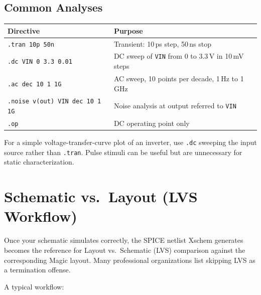 \documentclass[11pt]{article}
\begin{document}
\subsection{Common Analyses}

\begin{center}
\begin{tabular}{@{}lp{8.5cm}@{}}
\toprule
\textbf{Directive} & \textbf{Purpose} \\
\midrule
\texttt{.tran 10p 50n}        & Transient: 10\,ps step, 50\,ns stop \\
\texttt{.dc VIN 0 3.3 0.01}   & DC sweep of \texttt{VIN} from 0 to
                                3.3\,V in 10\,mV steps \\
\texttt{.ac dec 10 1 1G}      & AC sweep, 10 points per decade,
                                1\,Hz to 1\,GHz \\
\texttt{.noise v(out) VIN dec 10 1 1G}
                              & Noise analysis at output referred to
                                \texttt{VIN} \\
\texttt{.op}                  & DC operating point only \\
\bottomrule
\end{tabular}
\end{center}

For a simple voltage-transfer-curve plot of an inverter, use
\texttt{.dc} sweeping the input source rather than \texttt{.tran}.
Pulse stimuli can be useful but are unnecessary for static
characterization.

\section{Schematic vs.\ Layout (LVS Workflow)}

Once your schematic simulates correctly, the SPICE netlist Xschem
generates becomes the reference for Layout vs.\ Schematic (LVS)
comparison against the corresponding Magic layout.
Many professional organizations list skipping LVS as a termination
offense.

A typical workflow:
\end{document}
